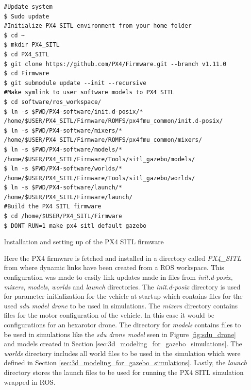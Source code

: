 \documentclass[../Head/report.tex]{subfiles}
\begin{document}
\begin{listing}[H] 
\begin{tcolorbox}[
    enhanced,
    attach boxed title to top left={xshift=6mm,yshift=-3mm},
    colback=lightgreen!20,
    colframe=lightgreen,
    fonttitle=\bfseries\color{black},
]
\begin{verbatim}
#Update system 
$ Sudo update 
#Initialize PX4 SITL environment from your home folder
$ cd ~
$ mkdir PX4_SITL
$ cd PX4_SITL
$ git clone https://github.com/PX4/Firmware.git --branch v1.11.0
$ cd Firmware
$ git submodule update --init --recursive
#Make symlink to user software models to PX4 SITL
$ cd software/ros_workspace/
$ ln -s $PWD/PX4-software/init.d-posix/* /home/$USER/PX4_SITL/Firmware/ROMFS/px4fmu_common/init.d-posix/
$ ln -s $PWD/PX4-software/mixers/* /home/$USER/PX4_SITL/Firmware/ROMFS/px4fmu_common/mixers/
$ ln -s $PWD/PX4-software/models/* /home/$USER/PX4_SITL/Firmware/Tools/sitl_gazebo/models/
$ ln -s $PWD/PX4-software/worlds/* /home/$USER/PX4_SITL/Firmware/Tools/sitl_gazebo/worlds/
$ ln -s $PWD/PX4-software/launch/* /home/$USER/PX4_SITL/Firmware/launch/
#Build the PX4 SITL firmware
$ cd /home/$USER/PX4_SITL/Firmware
$ DONT_RUN=1 make px4_sitl_default gazebo
\end{verbatim}
\end{tcolorbox}
\caption{Installation and setting up of the PX4 SITL firmware}
\label{lst:installation_px4_sitl}    
\end{listing}  

Here the PX4 firmware is fetched and installed in a directory called \textit{PX4\_SITL} from where dynamic links have been created from a ROS workspace. This configuration was made to easily link updates made in files from \textit{init.d-posix}, \textit{mixers}, \textit{models}, \textit{worlds} and \textit{launch} directories. The \textit{init.d-posix} directory is used for parameter initialization for the vehicle at startup which contains files for the used \textit{sdu model drone} to be used in simulations. The \textit{mixers} directory contains files for the motor configuration of the vehicle. In this case it would be configurations for an hexarotor drone. The directory for \textit{models} contains files to be used in simulations like the \textit{sdu drone model} seen in Figure  \ref{fig:sdu_drone} and models created in Section \ref{sec:3d_modeling_for_gazebo_simulations}. The \textit{worlds} directory includes all world files to be used in the simulation which were defined in Section \ref{sec:3d_modeling_for_gazebo_simulations}. Lastly, the \textit{launch} directory stores the launch files to be used for running the PX4 SITL simulation wrapped in ROS.   
\end{document}
